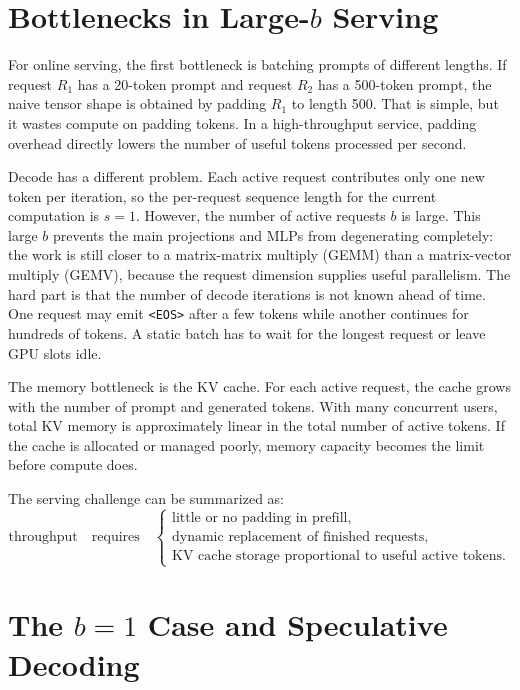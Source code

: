\documentclass[11pt]{article}
\newcommand{\EOS}{\texttt{<EOS>}}
\begin{document}
\section{Bottlenecks in Large-\texorpdfstring{\(b\)}{b} Serving}

For online serving, the first bottleneck is batching prompts of different lengths.  If request \(R_1\) has a 20-token prompt and request \(R_2\) has a 500-token prompt, the naive tensor shape is obtained by padding \(R_1\) to length 500.  That is simple, but it wastes compute on padding tokens.  In a high-throughput service, padding overhead directly lowers the number of useful tokens processed per second.

Decode has a different problem.  Each active request contributes only one new token per iteration, so the per-request sequence length for the current computation is \(s=1\).  However, the number of active requests \(b\) is large.  This large \(b\) prevents the main projections and MLPs from degenerating completely: the work is still closer to a matrix-matrix multiply (GEMM) than a matrix-vector multiply (GEMV), because the request dimension supplies useful parallelism.  The hard part is that the number of decode iterations is not known ahead of time.  One request may emit \EOS{} after a few tokens while another continues for hundreds of tokens.  A static batch has to wait for the longest request or leave GPU slots idle.

The memory bottleneck is the KV cache.  For each active request, the cache grows with the number of prompt and generated tokens.  With many concurrent users, total KV memory is approximately linear in the total number of active tokens.  If the cache is allocated or managed poorly, memory capacity becomes the limit before compute does.

The serving challenge can be summarized as:
\[
  \text{throughput} \quad \text{requires} \quad
  \begin{cases}
    \text{little or no padding in prefill},\\
    \text{dynamic replacement of finished requests},\\
    \text{KV cache storage proportional to useful active tokens}.
  \end{cases}
\]

\section{The \texorpdfstring{\(b=1\)}{b=1} Case and Speculative Decoding}
\end{document}
